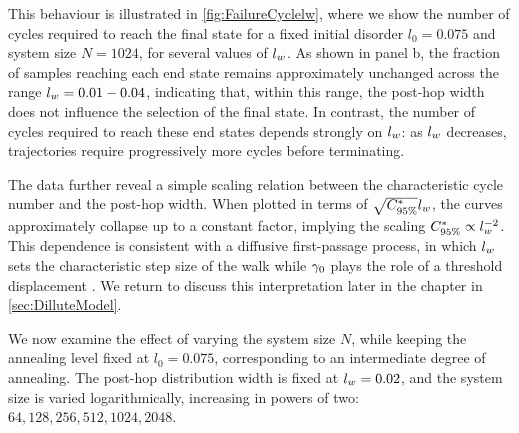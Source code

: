 This behaviour is illustrated in \cref{fig:FailureCyclelw}, where we show the number of cycles required to reach the final state for a fixed initial disorder $l_0 = 0.075$ and system size $N = 1024$, for several values of $l_w$. As shown in panel b, the fraction of samples reaching each end state remains approximately unchanged across the range $l_w=0.01-0.04$, indicating that, within this range, the post-hop width does not influence the selection of the final state. In contrast, the number of cycles required to reach these end states depends strongly on $l_w$: as $l_w$ decreases, trajectories require progressively more cycles before terminating.

The data further reveal a simple scaling relation between the characteristic cycle number and the post-hop width. When plotted in terms of $\sqrt{C^\ast_{95\%}}l_w$, the curves approximately collapse up to a constant factor, implying the scaling $C^\ast_{95\%} \propto l_w^{-2}$. This dependence is consistent with a diffusive first-passage process, in which $l_w$ sets the characteristic step size of the walk while $\gamma_0$ plays the role of a threshold displacement \cite{Redner_2001}. We return to discuss this interpretation later in the chapter in \cref{sec:DilluteModel}.

We now examine the effect of varying the system size $N$, while keeping the annealing level fixed at $l_0 = 0.075$, corresponding to an intermediate degree of annealing. The post-hop distribution width is fixed at $l_w=0.02$, and the system size is varied logarithmically, increasing in powers of two: $64, 128, 256, 512, 1024, 2048$.

